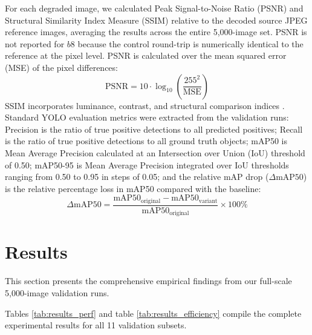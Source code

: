 \documentclass[12pt, a4paper]{article}
\begin{document}
For each degraded image, we calculated Peak Signal-to-Noise Ratio (PSNR) and Structural Similarity Index Measure (SSIM) relative to the decoded source JPEG reference images, averaging the results across the entire 5,000-image set. PSNR is not reported for $b8$ because the control round-trip is numerically identical to the reference at the pixel level. PSNR is calculated over the mean squared error (MSE) of the pixel differences:
    \begin{equation}
    \text{PSNR} = 10 \cdot \log_{10}\left(\frac{255^2}{\text{MSE}}\right)
    \label{eq:psnr}
    \end{equation}
SSIM incorporates luminance, contrast, and structural comparison indices \cite{wang2004}. Standard YOLO evaluation metrics were extracted from the validation runs: Precision is the ratio of true positive detections to all predicted positives; Recall is the ratio of true positive detections to all ground truth objects; mAP50 is Mean Average Precision calculated at an Intersection over Union (IoU) threshold of 0.50; mAP50-95 is Mean Average Precision integrated over IoU thresholds ranging from 0.50 to 0.95 in steps of 0.05; and the relative mAP drop ($\Delta \text{mAP50}$) is the relative percentage loss in mAP50 compared with the baseline:
    \begin{equation}
    \Delta \text{mAP50} = \frac{\text{mAP50}_{\text{original}} - \text{mAP50}_{\text{variant}}}{\text{mAP50}_{\text{original}}} \times 100\%
    \label{eq:map_drop}
    \end{equation}

\section{Results}
This section presents the comprehensive empirical findings from our full-scale 5,000-image validation runs.

Tables \ref{tab:results_perf} and table \ref{tab:results_efficiency} compile the complete experimental results for all 11 validation subsets. 
\end{document}
